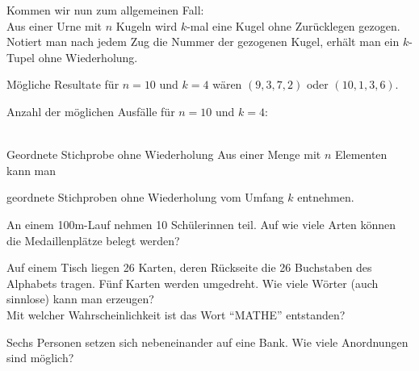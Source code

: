 Kommen wir nun zum allgemeinen Fall:\\
Aus einer Urne mit \(n\) Kugeln wird \(k\)-mal eine Kugel ohne Zurücklegen gezogen. Notiert man nach jedem Zug die Nummer der gezogenen Kugel, erhält man ein \(k\)-Tupel ohne Wiederholung.

Mögliche Resultate für \(n=10\) und \(k=4\) wären \((9,3,7,2)\) oder \((10,1,3,6)\).

Anzahl der möglichen Ausfälle für \(n=10\) und \(k=4\): \\\\

\begin{satz}
    {Geordnete Stichprobe ohne Wiederholung}{}
    Aus einer Menge mit \(n\) Elementen kann man

    \vspace{2cm}

    geordnete Stichproben ohne Wiederholung vom Umfang \(k\) entnehmen.
\end{satz}


\begin{bsp}
    {}{}
    An einem 100m-Lauf nehmen 10 Schülerinnen teil. Auf wie viele Arten können die Medaillenplätze belegt werden?

    \vspace{1cm}

\end{bsp}

\begin{bsp}
    {}{}
    Auf einem Tisch liegen 26 Karten, deren Rückseite die 26 Buchstaben des Alphabets tragen. Fünf Karten werden umgedreht. Wie viele Wörter (auch sinnlose) kann man erzeugen? \\
    Mit welcher Wahrscheinlichkeit ist das Wort ``MATHE'' entstanden?


    \vspace{2cm}

\end{bsp}

\begin{bsp}
    {}{}
    Sechs Personen setzen sich nebeneinander auf eine Bank. Wie viele Anordnungen sind möglich?

    \vspace{2cm}

\end{bsp}

